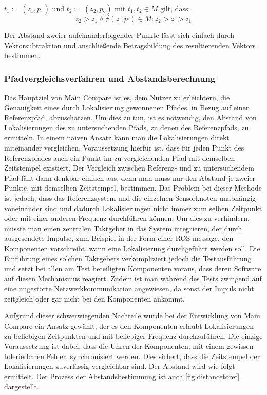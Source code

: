 $t_1 := (z_1, p_1)$ und $t_2 := (z_2, p_2)$
mit
$t_1,t_2 \in M$
gilt, dass:
\[
z_2 > z_1 \wedge \nexists (z^{,}, p^{,}) \in M : z_2 > z^{,} > z_1
\]

Der Abstand zweier aufeinanderfolgender Punkte lässt sich einfach durch
Vektorsubtraktion und anschließende Betragsbildung des resultierenden Vektors
bestimmen.

\subsubsection{Pfadvergleichsverfahren und Abstandsberechnung}

Das Hauptziel von Main Compare ist es, dem Nutzer zu erleichtern, die
Genauigkeit eines durch Lokalisierung gewonnenen Pfades, in Bezug auf einen
Referenzpfad, abzuschätzen. Um dies zu tun, ist es notwendig, den Abstand von
Lokalisierungen des zu untersuchenden Pfads, zu denen des Referenzpfads, zu
ermitteln. In einem naiven Ansatz kann man die Lokalisierungen direkt
miteinander vergleichen. Voraussetzung hierfür ist, dass für jeden Punkt des Referenzpfades auch
ein Punkt im zu vergleichenden Pfad mit demselben Zeitstempel existiert. Der
Vergleich zwischen Referenz- und zu untersuchendem Pfad fällt dann denkbar
einfach aus, denn man muss nur den Abstand je
zweier Punkte, mit demselben Zeitstempel, bestimmen.
Das Problem bei dieser Methode ist jedoch, dass das Referenzsystem und die
einzelnen Sensorknoten unabhängig voneinander sind und dadurch Lokalisierungen
nicht immer zum selben Zeitpunkt oder mit einer anderen Frequenz durchführen 
können. Um dies zu verhindern, müsste man einen zentralen
Taktgeber in das System integrieren, der durch ausgesendete Impulse, zum
Beispiel in der Form einer ROS message, den Komponenten vorschreibt,
wann eine Lokalisierung durchgeführt werden soll.
Die Einführung eines solchen Taktgebers verkompliziert jedoch die
Testausführung und setzt bei allen am Test beteiligten Komponenten voraus, dass
deren Software auf diesen Mechanismus reagiert. Zudem ist man während des Tests
zwingend auf eine ungestörte Netzwerkkommunikation angewiesen, da sonst der
Impuls nicht zeitgleich oder gar nicht bei den Komponenten ankommt.

Aufgrund dieser schwerwiegenden Nachteile wurde bei der Entwicklung von Main
Compare ein Ansatz gewählt, der es den Komponenten erlaubt Lokalisierungen zu
beliebigen Zeitpunkten und mit beliebiger Frequenz durchzuführen. Die einzige
Voraussetzung ist dabei, dass die Uhren der Komponenten, mit einem gewissen
tolerierbaren Fehler, synchronisiert werden. Dies sichert, dass die Zeitstempel der
Lokalisierungen zuverlässig vergleichbar sind. Der Abstand wird wie folgt
ermittelt. Der Prozess der Abstandsbestimmung ist auch
\autoref{fig:distancetoref} dargestellt.


